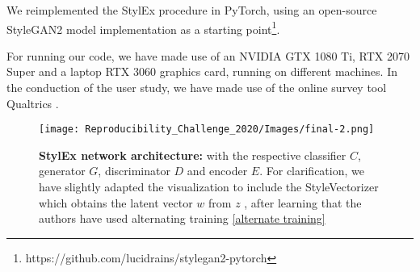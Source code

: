 We reimplemented the StylEx procedure in PyTorch, using an open-source StyleGAN2 model implementation as a starting point\footnote{https://github.com/lucidrains/stylegan2-pytorch}.

For running our code, we have made use of an NVIDIA GTX 1080 Ti, RTX 2070 Super and a laptop RTX 3060 graphics card, running on different machines. In the conduction of the user study, we have made use of the online survey tool Qualtrics \cite{qualtrics}.


\begin{comment}
The \href{https://github.com/google/explaining-in-style}{Jupyter Notebook} made available with the paper loads a pre-trained StylEx model, which is used to find and visualize classifier-specific attributes on the FFHQ dataset. The paper itself provided very little information on the implementation details of the StylEx framework. An open-source implementation in TensorFlow 2.7 was provided by the original authors, in the form of a Jupyter Notebook. However, it was quickly noted that this notebook lacked crucial elements to reproduce this research:

\begin{itemize}
    \item The only model that was provided was a StylEx model (or rather a multitude of models that encompass a singular StylEx model), which was fully trained on the FFHQ dataset with a perceived age classifier. The other datasets and classifiers reported were missing.
    \item The training code, including the hyperparameter configurations, was entirely missing from the notebook. While we could not obtain access to the training procedure code, through contact with the primary author the specifics of the optimization procedure were clarified, including the used hyperparameters configurations.
\end{itemize}

For these reasons, we have opted for a PyTorch implementation of the StylEx model and corresponding training procedure. Due to computational limitations, we evaluate the trained models on a subset of datasets present in the paper, with a reduced dimensionality of the generated images.


The notebook does contain a TensorFlow implementation of their \textit{AttFind} algorithm, which we translated into PyTorch code for our implementation.
\end{comment}


\begin{figure}[h!]
    \centering
    \texttt{[image: Reproducibility\_Challenge\_2020/Images/final-2.png]}
    \caption{\textbf{StylEx network architecture:} with the respective classifier $C$, generator $G$, discriminator $D$ and encoder $E$. For clarification, we have slightly adapted the visualization to include the StyleVectorizer which obtains the latent vector $w$ from $z$ \cite{karras2019style}, after learning that the authors have used alternating training \ref{alternate training}}
    \label{fig:network-architecture}
\end{figure}

